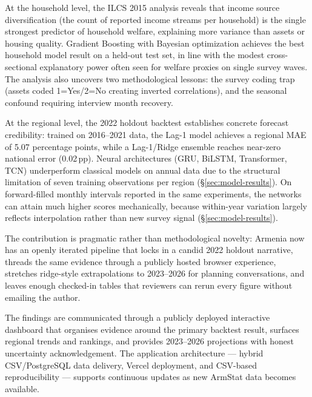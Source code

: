 \documentclass[12pt]{article}
\begin{document}
At the household level, the ILCS 2015 analysis reveals that income source
diversification (the count of reported income streams per household) is the single
strongest predictor of household welfare, explaining more variance than assets
or housing quality. Gradient Boosting with Bayesian optimization achieves the
best household model result on a held-out test set, in line with the modest
cross-sectional explanatory power often seen for welfare proxies on single
survey waves. The analysis also uncovers two
methodological lessons: the survey coding trap (assets coded 1=Yes/2=No creating
inverted correlations), and the seasonal confound requiring interview month
recovery.

At the regional level, the 2022 holdout backtest establishes concrete forecast
credibility: trained on 2016--2021 data, the Lag-1 model achieves a regional MAE
of 5.07 percentage points, while a Lag-1/Ridge ensemble reaches near-zero
national error (0.02\,pp). Neural architectures (GRU, BiLSTM, Transformer, TCN)
underperform classical models on annual data due to the structural limitation of
seven training observations per region (\S\ref{sec:model-results}). On
forward-filled monthly intervals reported in the same experiments, the networks
can attain much higher scores mechanically, because within-year variation largely
reflects interpolation rather than new survey signal (\S\ref{sec:model-results}).

\vspace{0.35em}
\noindent
The contribution is pragmatic rather than methodological novelty: Armenia now has an openly iterated pipeline that locks in a candid 2022 holdout narrative, threads the same evidence through a publicly hosted browser experience, stretches ridge-style extrapolations to 2023--2026 for planning conversations, and leaves enough checked-in tables that reviewers can rerun every figure without emailing the author.

\vspace{0.35em}
The findings are communicated through a publicly deployed interactive dashboard
that organises evidence around the primary backtest result, surfaces regional
trends and rankings, and provides 2023--2026 projections with honest uncertainty
acknowledgement. The application architecture --- hybrid CSV/PostgreSQL data
delivery, Vercel deployment, and CSV-based reproducibility --- supports
continuous updates as new ArmStat data becomes available.

\newpage

{}
\par
\vspace{0.35ex}%
\noindent{\color{rulecolor}\rule{\linewidth}{0.5pt}}\par\vspace{1em}
\end{document}
